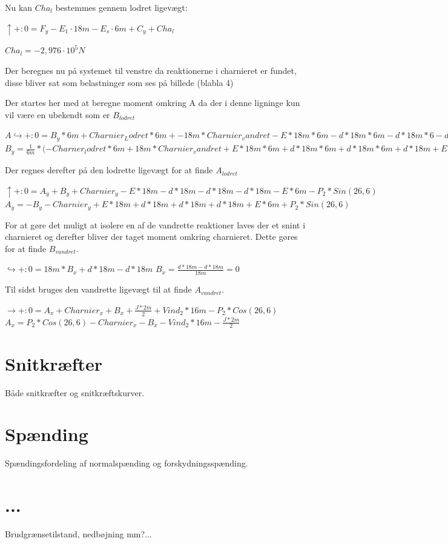 Nu kan $Cha_l$ bestemmes gennem lodret ligevægt: 
\begin{center}
	$\uparrow+: 0 = F_y - E_1 \cdot 18 m - E_s \cdot 6 m + C_y + Cha_l$
\end{center}
\begin{center}	
	$Cha_l = -2,\!976 \cdot 10^5N$
\end{center}

Der beregnes nu på systemet til venstre da reaktionerne i charnieret er fundet, disse bliver sat som belastninger som ses på billede (blabla 4)


Der startes her med at beregne moment omkring A da der i denne ligninge kun vil være en ubekendt som er $B_{lodret}$  
\begin{center}
	$A\hookrightarrow+:0=B_y*6m+Charnier_Lodret*6m+-18m*Charnier_vandret-E*18m*6m-d*18m*6m-d*18m*6-d-18m-E*6m*\frac{6}{2}+P_2*Cos(26,\!6)*18m-Vind_2*18m*(\frac{16}{2}m+2m)-\frac{J*2m}{2}*(\frac{2m}{2})$
	$B_y=\frac{1}{6m}*(-Charner_lodret*6m+18m*Charnier_vandret+E*18m*6m+d*18m*6m+d*18m*6m+d*18m+E*6m*\frac{6}{2}m-P_2*Cos(26,\!6)*18m+Vind_2*18m*(8m+2m+\frac{J*2m}{2}*\frac{2m}{2})$
\end{center}

Der regnes derefter på den lodrette ligevægt for at finde $A_{lodret}$
\begin{center}
	$\uparrow+:0=A_y+B_y+Charnier_y-E*18m-d*18m-d*18m-d*18m-E*6m-P_2*Sin(26,\!6)$
	$A_y=-B_y-Charnier_y+E*18m+d*18m+d*18m+d*18m+E*6m+P_2*Sin(26,\!6)$
\end{center}

For at gøre det muligt at isolere en af de vandrette reaktioner laves der et snint i charnieret og derefter bliver der taget moment omkring charnieret. Dette gøres for at finde $B_{vandret}$.
\begin{center}
	$\hookrightarrow+:0=18m*B_x+d*18m-d*18m$
	$B_x=\frac{d*18m-d*18m}{18m}=0$
\end{center}

Til sidst bruges den vandrette ligevægt til at finde $A_{vandret}$.
\begin{center}
	$\rightarrow+:0=A_x+Charnier_x+B_x+\frac{J*2m}{2}+Vind_2*16m-P_2*Cos(26,\!6)$
	$A_x=P_2*Cos(26,\!6)-Charnier_x-B_x-Vind_2*16m-\frac{J*2m}{2}$
\end{center} 
 
\section{Snitkræfter}
Både snitkræfter og snitkræftskurver.

\section{Spænding}
Spændingsfordeling af normalspænding og forskydningsspænding.

\section{...}
Brudgrænsetilstand, nedbøjning mm?...